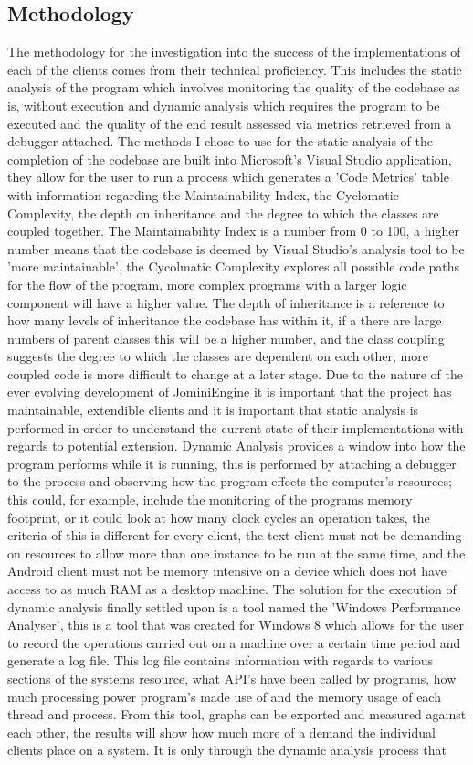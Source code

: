 \documentclass{article}
\begin{document}
\subsection{Methodology}
The methodology for the investigation into the success of the implementations of each of the clients comes from their technical proficiency. This includes the static analysis of the program which involves monitoring the quality of the codebase as is, without execution and dynamic analysis which requires the program to be executed and the quality of the end result assessed via metrics retrieved from a debugger attached. The methods I chose to use for the static analysis of the completion of the codebase are built into Microsoft's Visual Studio application, they allow for the user to run a process which generates a 'Code Metrics' table with information regarding the Maintainability Index, the Cyclomatic Complexity, the depth on inheritance and the degree to which the classes are coupled together. The Maintainability Index is a number from 0 to 100, a higher number means that the codebase is deemed by Visual Studio's analysis tool to be 'more maintainable', the Cycolmatic Complexity explores all possible code paths for the flow of the program, more complex programs with a larger logic component will have a higher value. The depth of inheritance is a reference to how many levels of inheritance the codebase has within it, if a there are large numbers of parent classes this will be a higher number, and the class coupling suggests the degree to which the classes are dependent on each other, more coupled code is more difficult to change at a later stage. Due to the nature of the ever evolving development of JominiEngine it is important that the project has maintainable, extendible clients and it is important that static analysis is performed in order to understand the current state of their implementations with regards to potential extension. Dynamic Analysis provides a window into how the program performs while it is running, this is performed by attaching a debugger to the process and observing how the program effects the computer's resources; this could, for example, include the monitoring of the programs memory footprint, or it could look at how many clock cycles an operation takes, the criteria of this is different for every client, the text client must not be demanding on resources to allow more than one instance to be run at the same time, and the Android client must not be memory intensive on a device which does not have access to as much RAM as a desktop machine. The solution for the execution of dynamic analysis finally settled upon is a tool named the 'Windows Performance Analyser', this is a tool that was created for Windows 8 which allows for the user to record the operations carried out on a machine over a certain time period and generate a log file. This log file contains information with regards to various sections of the systems resource, what API's have been called by programs, how much processing power program's made use of and the memory usage of each thread and process. From this tool, graphs can be exported and measured against each other, the results will show how much more of a demand the individual clients place on a system. It is only through the dynamic analysis process that 
\end{document}

